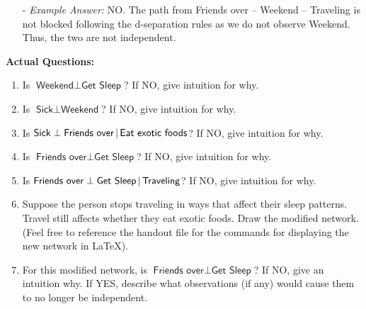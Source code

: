 \documentclass[submit]{../harvardml}
\newcommand{\attr}[1]{\textsf{#1}}
\begin{document}
\begin{problem}
\begin{itemize}
    \item[-] \textit{Example Answer:} NO. The path from Friends over -- Weekend -- Traveling is not blocked following the d-separation rules as we do not observe Weekend. Thus, the two are not independent. 
  \end{itemize}

  \noindent \textbf{Actual Questions:}

  \begin{enumerate}
    \item Is $\attr{Weekend} \perp \attr{Get Sleep}$?
      If NO, give intuition for why.

    \item Is $\attr{Sick} \perp \attr{Weekend}$?
      If NO, give intuition for why.

    \item Is $\attr{Sick} \perp \attr{Friends over}\given \attr{Eat exotic
      foods}$? If NO, give intuition for why.

    \item Is $\attr{Friends over} \perp \attr{Get Sleep}$? If NO, give
      intuition for why.

    \item Is $\attr{Friends over} \perp \attr{Get Sleep} \given
      \attr{Traveling}$? If NO, give intuition for why.

    \item Suppose the person stops traveling in ways that affect their
      sleep patterns.  Travel still
      affects whether they eat exotic foods.  Draw the modified network. (Feel free to reference the handout file for the commands for displaying the new network in \LaTeX).

    \item For this modified network, is $\attr{Friends over} \perp
      \attr{Get Sleep}$? If NO, give an intuition why.  If YES,
      describe what observations (if any) would cause them to no longer be
      independent.
  \end{enumerate}
\end{problem}
\end{document}
